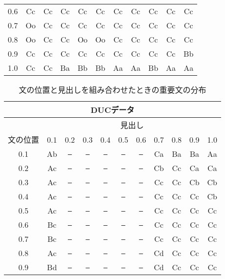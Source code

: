 \begin{table}[tb]
\begin{center}
\begin{tabular}{c|cccccccccc}
0.6                    & Cc & Cc & Cc & Cc & Cc & Cc & Cc & Cc & Cc & Cc \\
0.7                    & Oo & Cc & Cc & Cc & Cc & Cc & Cc & Cc & Cc & Cc \\
0.8                    & Oo & Cc & Cc & Oo & Oo & Cc & Cc & Cc & Cc & Cc \\
0.9                    & Cc & Cc & Cc & Cc & Cc & Cc & Cc & Cc & Cc & Bb \\
1.0                    & Cc & Cc & Ba & Bb & Bb & Aa & Aa & Bb & Aa & Aa \\
\hline
\end{tabular}
\end{center}
\end{table}

\begin{table}[tb]\small
\caption{文の位置と見出しを組み合わせたときの重要文の分布}
\label{table:diagram_pst_hlnoun}
\begin{center}
\begin{tabular}{c|cccccccccc} \hline \hline
\multicolumn{11}{c}{DUCデータ} \\ \hline
 & \multicolumn{10}{c}{見出し} \\ \cline{2-11}
文の位置 & 0.1 & 0.2 & 0.3 & 0.4 & 0.5 & 0.6 & 0.7 & 0.8 & 0.9 & 1.0 \\ \hline
0.1                    & Ab & {\tt --} & {\tt --} & {\tt --} & {\tt --} & {\tt --} & Ca & Ba & Ba & Aa \\
0.2                    & Ac & {\tt --} & {\tt --} & {\tt --} & {\tt --} & {\tt --} & Cb & Cc & Ca & Ca \\
0.3                    & Ac & {\tt --} & {\tt --} & {\tt --} & {\tt --} & {\tt --} & Cc & Cc & Cb & Cb \\
0.4                    & Ac & {\tt --} & {\tt --} & {\tt --} & {\tt --} & {\tt --} & Cc & Cc & Cc & Cb \\
0.5                    & Ac & {\tt --} & {\tt --} & {\tt --} & {\tt --} & {\tt --} & Cc & Cc & Cc & Cc \\
0.6                    & Bc & {\tt --} & {\tt --} & {\tt --} & {\tt --} & {\tt --} & Cc & Cc & Cc & Cc \\
0.7                    & Bc & {\tt --} & {\tt --} & {\tt --} & {\tt --} & {\tt --} & Cc & Cc & Cc & Cc \\
0.8                    & Ac & {\tt --} & {\tt --} & {\tt --} & {\tt --} & {\tt --} & Cd & Cc & Cc & Cc \\
0.9                    & Bd & {\tt --} & {\tt --} & {\tt --} & {\tt --} & {\tt --} & Cd & Cc & Cc & Cc \\

\end{tabular}
\end{center}
\end{table}
